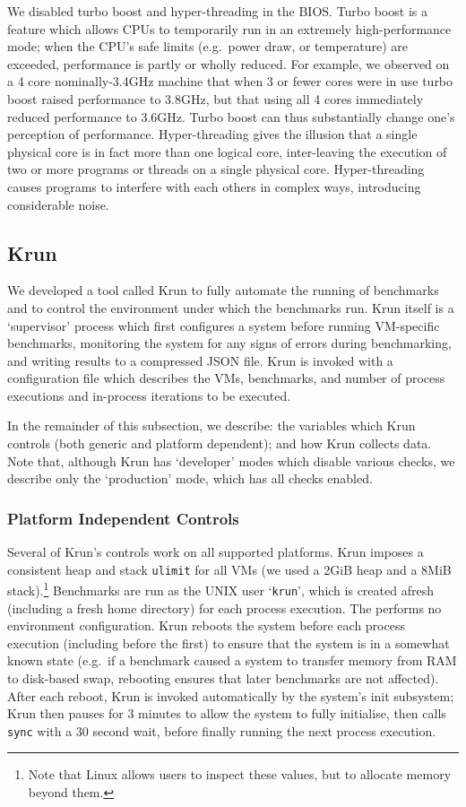 \documentclass[preprint,numbers,10pt]{sigplanconf}
\newcommand{\krun}{Krun\xspace}
\begin{document}
We disabled turbo boost and hyper-threading in the BIOS. Turbo boost is a
feature which allows CPUs to temporarily run in an extremely high-performance
mode; when the CPU's safe limits (e.g.~power draw, or temperature) are exceeded,
performance is partly or wholly reduced. For example, we observed on a 4 core
nominally-3.4GHz machine that when 3 or fewer cores were in use turbo boost
raised performance to 3.8GHz, but that using all 4 cores immediately reduced
performance to 3.6GHz. Turbo boost can thus substantially change one's
perception of performance. Hyper-threading gives the illusion that a single
physical core is in fact more than one logical core, inter-leaving the
execution of two or more programs or threads on a single physical core.
Hyper-threading causes programs to interfere
with each others in complex ways, introducing considerable noise.


\subsection{\krun}
\label{krun}

We developed a tool called \krun to fully automate the running of benchmarks
and to control the environment under which the benchmarks run. \krun itself is a
`supervisor' process which first configures a system before running VM-specific
benchmarks, monitoring the system for any signs of errors during benchmarking,
and writing results to a compressed JSON file. \krun is invoked with a
configuration file which describes the VMs, benchmarks, and number of process
executions and in-process iterations to
be executed.

In the remainder of this subsection, we describe: the variables which \krun
controls (both generic and platform dependent); and how \krun collects data.
Note that, although \krun has `developer' modes which disable various checks,
we describe only the `production' mode, which has all checks enabled.


\subsubsection{Platform Independent Controls}

Several of \krun's controls work on all supported platforms. \krun imposes a
consistent heap and stack \texttt{ulimit} for all
VMs (we used a 2GiB heap and a 8MiB stack).\footnote{Note that Linux allows users
to inspect these values, but to allocate memory beyond them.} Benchmarks are run
as the UNIX user `\texttt{krun}', which is created afresh (including a fresh
home directory) for each process execution. The performs no environment
configuration.
\krun reboots the system before each process execution (including
before the first) to ensure that the system is in a somewhat known state
(e.g.~if a benchmark caused a system to transfer memory from RAM to disk-based swap,
rebooting ensures that later benchmarks are not affected). After each reboot, \krun
is invoked automatically by the system's init subsystem; \krun then pauses for
3 minutes to allow the system to fully initialise, then calls \texttt{sync}
with a 30 second wait, before finally running the next process execution.
\end{document}
